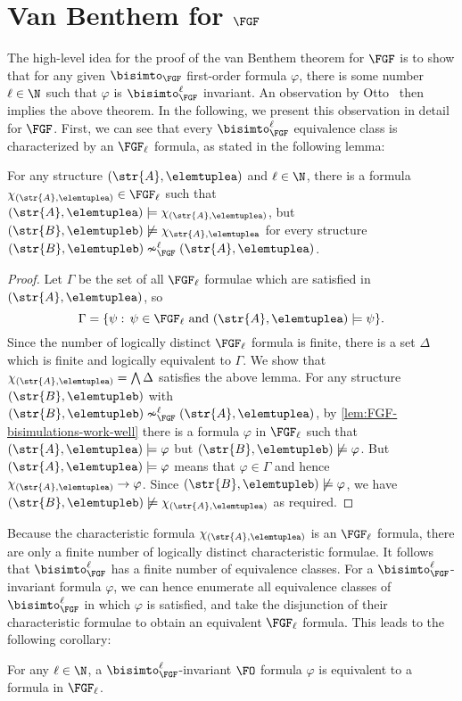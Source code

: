\section{Van Benthem for $\FGF$}\label{sec:van-benthem-theorem}
The high-level idea for the proof of the van Benthem theorem for $\FGF$ is to show that for any given $\bisimto_{\FGF}$ first-order formula $\varphi$, there is some number $\ell \in \N$ such that $\varphi$ is $\bisimto_{\FGF}^{\ell}$ invariant.
An observation by Otto~\cite[Obs.~13]{Otto04} then implies the above theorem.
In the following, we present this observation in detail for $\FGF$.
First, we can see that every $\bisimto_{\FGF}^{\ell}$ equivalence class is characterized by an $\FGF_{\ell}$ formula, as stated in the following lemma:
\begin{lemma}
  For any structure $(\str{A}, \elemtuplea)$ and $\ell \in \N$, there is a formula $\chi_{(\str{A}, \elemtuplea)} \in \FGF_{\ell}$ such that $(\str{A}, \elemtuplea) \models \chi_{(\str{A}, \elemtuplea)}$, but $(\str{B}, \elemtupleb) \not\models \chi_{\str{A}, \elemtuplea}$ for every structure $(\str{B}, \elemtupleb) \nsim^{\ell}_{\FGF} (\str{A}, \elemtuplea)$.
\end{lemma}
\begin{proof}
  Let $\Gamma$  be the set of all $\FGF_{\ell}$ formulae which are satisfied in $(\str{A}, \elemtuplea)$, so
  \begin{equation*}
    \Gamma = \{ \psi:\, \psi \in \FGF_{\ell} \text{ and } (\str{A}, \elemtuplea) \models \psi \}.
  \end{equation*}
  Since the number of logically distinct $\FGF_{\ell}$ formula is finite, there is a set $\Delta$ which is finite and logically equivalent to $\Gamma$.
  We show that $\chi_{(\str{A}, \elemtuplea)} = \bigwedge \Delta$ satisfies the above lemma.
  For any structure $(\str{B}, \elemtupleb)$ with $(\str{B}, \elemtupleb) \nsim_{\FGF}^{\ell} (\str{A}, \elemtuplea)$, by \cref{lem:FGF-bisimulations-work-well} there is a formula $\varphi$ in $\FGF_{\ell}$ such that $(\str{A}, \elemtuplea) \models \varphi$ but $(\str{B}, \elemtupleb) \not\models \varphi$.
  But $(\str{A}, \elemtuplea) \models \varphi$ means that $\varphi \in \Gamma$ and hence $\chi_{(\str{A},\elemtuplea)} \to \varphi$.
  Since $(\str{B}, \elemtupleb) \not\models \varphi$, we have $(\str{B}, \elemtupleb) \not\models \chi_{(\str{A}, \elemtuplea)}$ as required.
\end{proof}
Because the characteristic formula $\chi_{(\str{A}, \elemtuplea)}$ is an $\FGF_{\ell}$ formula, there are only a finite number of logically distinct characteristic formulae.
It follows that $\bisimto_{\FGF}^{\ell}$ has a finite number of equivalence classes.
For a $\bisimto_{\FGF}^{\ell}$-invariant formula $\varphi$, we can hence enumerate all equivalence classes of $\bisimto_{\FGF}^{\ell}$ in which $\varphi$ is satisfied, and take the disjunction of their characteristic formulae to obtain an equivalent $\FGF_{\ell}$ formula.
This leads to the following corollary:
\begin{corollary}\label{cor:ell-invariant-has-ell-formula}
  For any $\ell \in \N$, a $\bisimto_{\FGF}^{\ell}$-invariant $\FO$ formula $\varphi$ is equivalent to a formula in $\FGF_{\ell}$.
\end{corollary}

